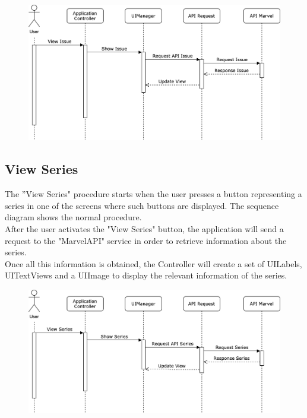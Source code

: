 \vspace{5mm}

\begin{figure}[h]
\centering
\includegraphics[width=\textwidth]{img/seqdiagrams/viewissue}
\end{figure}

\clearpage

\subsection{View Series}
The ”View Series" procedure starts when the user presses a button representing a series in one of the screens where such buttons are displayed. The sequence diagram shows the normal procedure. \\
After the user activates the "View Series" button, the application will send a request to the "MarvelAPI" service in order to retrieve information about the series. \\
Once all this information is obtained, the Controller will create a set of UILabels, UITextViews and a UIImage to display the relevant information of the series. 

\vspace{5mm}

\begin{figure}[h]
\centering
\includegraphics[width=\textwidth]{img/seqdiagrams/viewseries}
\end{figure}

